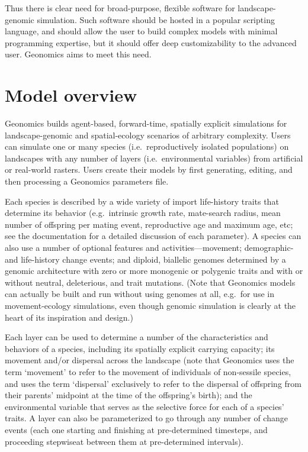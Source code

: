 ﻿\documentclass{article}
\begin{document}
Thus there is clear need for broad-purpose, flexible software for
landscape-genomic simulation.
Such software should be hosted in a
popular scripting language, and should allow the user to build complex
models with minimal programming expertise, but it should offer deep
customizability to the advanced user.
Geonomics aims to meet this need.


\section{Model overview}

Geonomics builds agent-based, forward-time, spatially explicit simulations
for landscape-genomic and spatial-ecology scenarios of arbitrary complexity.
Users can simulate one or many species (i.e.\ reproductively isolated populations)
on landscapes with any number of layers (i.e.\ environmental variables)
from artificial or real-world rasters.
Users create their models by first generating, editing, and then processing
a Geonomics parameters file.

Each species is described by a wide variety of import life-history traits that
determine its behavior (e.g.\ intrinsic growth rate, mate-search radius, mean number of
offspring per mating event, reproductive age and maximum age, etc;
see the documentation for a detailed discussion of each parameter).
A species can also use a number of optional features
and activities---movement; demographic- and life-history change events;
and diploid, biallelic genomes determined by a genomic architecture
with zero or more monogenic or polygenic traits
and with or without neutral, deleterious, and trait mutations.
(Note that Geonomics models can actually be built and run without using genomes at all,
e.g.\ for use in movement-ecology simulations,
even though genomic simulation is clearly at
the heart of its inspiration and design.)

Each layer can be used to determine a number of the characteristics and behaviors of a
species, including its spatially explicit carrying capacity;
its movement and/or dispersal across the landscape (note that Geonomics 
uses the term `movement' to refer to the movement of individuals of non-sessile species,
and uses the term `dispersal' exclusively to refer to the dispersal of offspring from 
their parents' midpoint at the time of the offspring's birth); and the environmental
variable that serves as the selective force for each of a species' traits. A layer
can also be parameterized to go through any number of change events (each one starting
and finishing at pre-determined timesteps, and proceeding stepwiseat between them
at pre-determined intervals).
\end{document}
